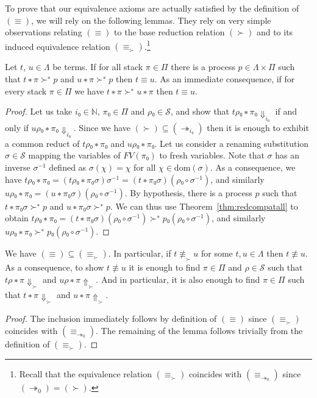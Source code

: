 To prove that our equivalence axioms are actually satisfied by the definition
of $(≡)$, we will rely on the following lemmas. They rely on very simple
observations relating $(≡)$ to the base reduction relation $(≻)$ and to its
induced equivalence relation $(≡_{≻})$.\footnote{Recall that the equivalence
relation $(≡_{≻})$ coincides with $(≡_{↠_0})$ since $(↠_0) = (≻)$.}
\begin{lemma}\label{lem:eqred}
  Let $t$, $u ∈ Λ$ be terms. If for all stack $π ∈ Π$ there is a process
  $p ∈ Λ×Π$ such that ${t ∗ π} ≻^{∗} p$ and ${u ∗ π} ≻^{∗} p$ then $t ≡ u$.
  As an immediate consequence, if for every stack $π ∈ Π$ we have
  ${t ∗ π} ≻^{∗} {u ∗ π}$ then $t ≡ u$.
\end{lemma}
\begin{proof}
  Let us take $i₀ ∈ \mathbb{N}$, $π₀ ∈ Π$ and $ρ₀ ∈ \mathcal{S}$, and show
  that ${tρ₀ ∗ π₀} {⇓}_{i₀}$ if and only if ${uρ₀ ∗ π₀ {⇓}_{i₀}}$. Since we
  have $(≻) ⊆ (↠_{i₀})$ then it is enough to exhibit a common reduct of
  $tρ₀ ∗ π₀$ and $uρ₀ ∗ π₀$.
  Let us consider a renaming substitution $σ ∈ \mathcal{S}$ mapping the
  variables of $FV(π₀)$ to fresh variables. Note that $σ$ has an inverse
  $σ^{-1}$ defined as $σ(χ) = χ$ for all $χ∈\text{dom}(σ)$. As a consequence,
  we have ${tρ₀ ∗ π₀} = {(tρ₀ ∗ π₀σ)σ^{-1}} = {(t ∗ π₀σ)(ρ₀ \circ σ^{-1})}$,
  and similarly ${uρ₀ ∗ π₀} = {(u ∗ π₀σ)(ρ₀ \circ σ^{-1})}$.
  By hypothesis, there is a process $p$ such that ${t ∗ π₀σ} ≻^{∗} p$ and
  ${u ∗ π₀σ} ≻^{∗} p$. We can thus use Theorem~\ref{thm:redcompatall} to
  obtain ${tρ₀∗π₀} = {(t ∗ π₀σ)(ρ₀ \circ σ^{-1})} ≻^{∗} p₀(ρ₀ \circ σ^{-1})$,
  and similarly ${uρ₀ ∗ π₀} ≻^{∗} p₀(ρ₀ \circ σ^{-1})$.
\end{proof}
\begin{lemma}\label{lem:stcntrex}%
  We have $(≡) ⊆ (≡_{≻})$. In particular, if $t \not\equiv_{≻} u$ for some
  $t, u ∈ Λ$ then $t \not\equiv u$. As a consequence, to show $t \not\equiv u$
  it is enough to find $π∈Π$ and $ρ∈\mathcal{S}$ such that ${tρ ∗ π} {⇓}_{≻}$
  and ${uρ ∗ π} {⇑}_{≻}$. And in particular, it is also enough to find $π∈Π$
  such that ${t ∗ π} {⇓}_{≻}$ and ${u ∗ π} {⇑}_{≻}$.
\end{lemma}
\begin{proof}
  The inclusion immediately follows by definition of $(≡)$ since $(≡_{≻})$
  coincides with $(≡_{↠_0})$. The remaining of the lemma follows trivially
  from the definition of $(≡_{≻})$.
\end{proof}

